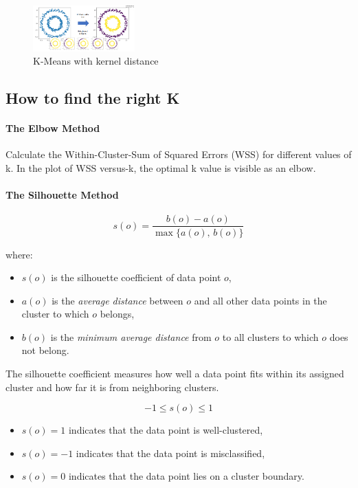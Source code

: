 \documentclass[11pt]{article}
\begin{document}
\begin{figure}[h]
	\centering
	\includegraphics[width=0.35\textwidth]{../imgs/kmeans-ker.png} 
	\caption{K-Means with kernel distance}
\end{figure}



\subsection*{How to find the right K}

\paragraph*{The Elbow Method}
Calculate the Within-Cluster-Sum of Squared Errors (WSS) for different values of k. In the plot of WSS versus-k, the optimal k value is visible as an elbow.

\paragraph*{The Silhouette Method}

\[
s(o) = \frac{b(o) - a(o)}{\max\{a(o),\, b(o)\}}
\]

\noindent where:
\begin{itemize}
    \item $s(o)$ is the silhouette coefficient of data point $o$,
    \item $a(o)$ is the \textit{average distance} between $o$ and all other data points in the cluster to which $o$ belongs,
    \item $b(o)$ is the \textit{minimum average distance} from $o$ to all clusters to which $o$ does not belong.
\end{itemize}

The silhouette coefficient measures how well a data point fits within its assigned cluster and how far it is from neighboring clusters.

\[
-1 \leq s(o) \leq 1
\]
\begin{itemize}
    \item $s(o) = 1$ indicates that the data point is well-clustered,
    \item $s(o) = -1$ indicates that the data point is misclassified,
    \item $s(o) = 0$ indicates that the data point lies on a cluster boundary.
\end{itemize}
\end{document}
